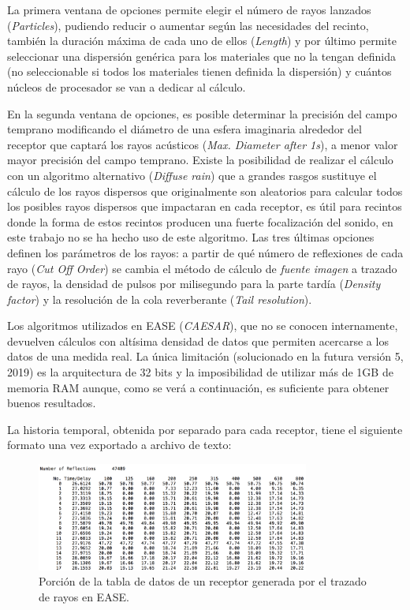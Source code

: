 La primera ventana de opciones permite elegir el número de rayos lanzados (\textit{Particles}), pudiendo reducir o aumentar según las necesidades del recinto, también la duración máxima de cada uno de ellos (\textit{Length}) y por último permite seleccionar una dispersión genérica para los materiales que no la tengan definida (no seleccionable si todos los materiales tienen definida la dispersión) y cuántos núcleos de procesador se van a dedicar al cálculo.

En la segunda ventana de opciones, es posible determinar la precisión del campo temprano modificando el diámetro de una esfera imaginaria alrededor del receptor que captará los rayos acústicos (\textit{Max. Diameter after 1s}), a menor valor mayor precisión del campo temprano. Existe la posibilidad de realizar el cálculo con un algoritmo alternativo (\textit{Diffuse rain}) que a grandes rasgos sustituye el cálculo de los rayos dispersos que originalmente son aleatorios para calcular todos los posibles rayos dispersos que impactaran en cada receptor, es útil para recintos donde la forma de estos recintos producen una fuerte focalización del sonido, en este trabajo no se ha hecho uso de este algoritmo. Las tres últimas opciones definen los parámetros de los rayos: a partir de qué número de reflexiones de cada rayo (\textit{Cut Off Order}) se cambia el método de cálculo de \textit{fuente imagen} a trazado de rayos, la densidad de pulsos por milisegundo para la parte tardía (\textit{Density factor}) y la resolución de la cola reverberante (\textit{Tail resolution}).
\\
\par
Los algoritmos utilizados en EASE (\textit{CAESAR}), que no se conocen internamente, devuelven cálculos con altísima densidad de datos que permiten acercarse a los datos de una medida real. La única limitación (solucionado en la futura versión 5, 2019) es la arquitectura de 32 bits y la imposibilidad de utilizar más de 1GB de memoria RAM aunque, como se verá a continuación, es suficiente para obtener buenos resultados.

La historia temporal, obtenida por separado para cada receptor, tiene el siguiente formato una vez exportado a archivo de texto:

\begin{figure}[ht]
    \centering
    \includegraphics[width=0.8\textwidth]{archivos/capturas/rayeasetxt.png}
    \caption{Porción de la tabla de datos de un receptor generada por el trazado de rayos en EASE.}
\end{figure}
\FloatBarrier

